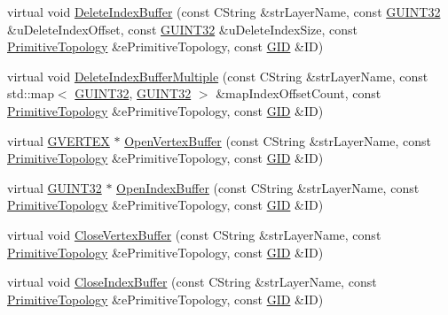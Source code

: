\begin{DoxyCompactItemize}
\item 
virtual void \hyperlink{class_c_g_d_c_direct_x11_a379f852b56b7dfd9c8ad6592d2853a08}{Delete\+Index\+Buffer} (const C\+String \&str\+Layer\+Name, const \hyperlink{_g_types_8h_a2e1a1c77d1349057202e2f34e071019c}{G\+U\+I\+N\+T32} \&u\+Delete\+Index\+Offset, const \hyperlink{_g_types_8h_a2e1a1c77d1349057202e2f34e071019c}{G\+U\+I\+N\+T32} \&u\+Delete\+Index\+Size, const \hyperlink{_g_types_8h_a940e3da6a9b57aae3de0b050e2a7af5e}{Primitive\+Topology} \&e\+Primitive\+Topology, const \hyperlink{_g_types_8h_a5b96ecb16d8e437977d12cd40aa6f6d8}{G\+I\+D} \&I\+D)
\item 
virtual void \hyperlink{class_c_g_d_c_direct_x11_a634ed0a72750924fb4874be415ca4808}{Delete\+Index\+Buffer\+Multiple} (const C\+String \&str\+Layer\+Name, const std\+::map$<$ \hyperlink{_g_types_8h_a2e1a1c77d1349057202e2f34e071019c}{G\+U\+I\+N\+T32}, \hyperlink{_g_types_8h_a2e1a1c77d1349057202e2f34e071019c}{G\+U\+I\+N\+T32} $>$ \&map\+Index\+Offset\+Count, const \hyperlink{_g_types_8h_a940e3da6a9b57aae3de0b050e2a7af5e}{Primitive\+Topology} \&e\+Primitive\+Topology, const \hyperlink{_g_types_8h_a5b96ecb16d8e437977d12cd40aa6f6d8}{G\+I\+D} \&I\+D)
\item 
virtual \hyperlink{struct_g_v_e_r_t_e_x}{G\+V\+E\+R\+T\+E\+X} $\ast$ \hyperlink{class_c_g_d_c_direct_x11_a3ca854dcc4dfb0177b4135151e0a7871}{Open\+Vertex\+Buffer} (const C\+String \&str\+Layer\+Name, const \hyperlink{_g_types_8h_a940e3da6a9b57aae3de0b050e2a7af5e}{Primitive\+Topology} \&e\+Primitive\+Topology, const \hyperlink{_g_types_8h_a5b96ecb16d8e437977d12cd40aa6f6d8}{G\+I\+D} \&I\+D)
\item 
virtual \hyperlink{_g_types_8h_a2e1a1c77d1349057202e2f34e071019c}{G\+U\+I\+N\+T32} $\ast$ \hyperlink{class_c_g_d_c_direct_x11_a11a671d20afef544d8044df1ffce874c}{Open\+Index\+Buffer} (const C\+String \&str\+Layer\+Name, const \hyperlink{_g_types_8h_a940e3da6a9b57aae3de0b050e2a7af5e}{Primitive\+Topology} \&e\+Primitive\+Topology, const \hyperlink{_g_types_8h_a5b96ecb16d8e437977d12cd40aa6f6d8}{G\+I\+D} \&I\+D)
\item 
virtual void \hyperlink{class_c_g_d_c_direct_x11_a9d1d0f016034cd88f2a55c80718c131a}{Close\+Vertex\+Buffer} (const C\+String \&str\+Layer\+Name, const \hyperlink{_g_types_8h_a940e3da6a9b57aae3de0b050e2a7af5e}{Primitive\+Topology} \&e\+Primitive\+Topology, const \hyperlink{_g_types_8h_a5b96ecb16d8e437977d12cd40aa6f6d8}{G\+I\+D} \&I\+D)
\item 
virtual void \hyperlink{class_c_g_d_c_direct_x11_a357e3207945e0c98e5844c8f2880edcf}{Close\+Index\+Buffer} (const C\+String \&str\+Layer\+Name, const \hyperlink{_g_types_8h_a940e3da6a9b57aae3de0b050e2a7af5e}{Primitive\+Topology} \&e\+Primitive\+Topology, const \hyperlink{_g_types_8h_a5b96ecb16d8e437977d12cd40aa6f6d8}{G\+I\+D} \&I\+D)

\end{DoxyCompactItemize}
